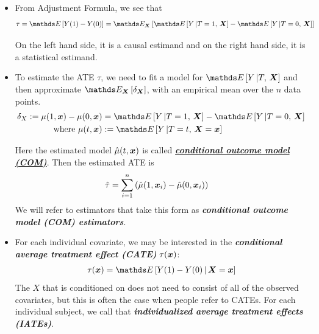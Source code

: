 \documentclass[11pt]{article}
\begin{document}
\begin{itemize}
\item From Adjustment Formula, we see that 
\begin{align*}
\tau= \E{}{Y(1) - Y(0)} &= \E{\mb{X}}{ \E{}{Y \,|T=1,\,\mb{X} }- \E{}{Y \,|T=0, \, \mb{X}}}  
\end{align*}

On the left hand side, it is a causal estimand and on the right hand side, it is a statistical estimand. 

\item To estimate the ATE $\tau$, we need to fit a model for $ \E{}{Y \,|T,\, \mb{X} }$ and then approximate $\E{\mb{X}}{\delta_{\mb{X}}}$, with an empirical mean over the $n$ data
points. 
\begin{align}
\delta_{X} := \mu(1, \mb{x}) - \mu(0, \mb{x}) &=  \E{}{Y \,|T=1,\,\mb{X} }- \E{}{Y \,|T=0, \, \mb{X}} \label{eqn: cond_outcome} \\
\text{where }\mu(t, \mb{x})&:= \E{}{Y \,|T=t,\,\mb{X} = \mb{x} } \nonumber
\end{align}

Here the estimated model $\hat{\mu}(t, \boldsymbol{x})$ is called \underline{\textbf{\emph{conditional outcome model (COM)}}}. Then the estimated ATE is
\begin{align}
\hat{\tau} &= \sum_{i=1}^{n}\left(\hat{\mu}(1, \boldsymbol{x}_i) - \hat{\mu}(0, \boldsymbol{x}_i)\right) \label{eqn: cond_outcome_est_ate}
\end{align} We will refer to estimators that take this form as \emph{\textbf{conditional outcome model (COM) estimators}}.

\item For each individual covariate, we may be interested in the \emph{\textbf{conditional average treatment effect (CATE)}} $\tau(\boldsymbol{x})$: 
\begin{align}
\tau(\mb{x})= \E{}{Y(1) - Y(0) \,|\, \mb{X} = \mb{x}} \label{eqn: cate}
\end{align} The $X$ that is conditioned on does not need to consist of all of the observed covariates, but this is often the case when people refer to CATEs. For each individual subject, we call that \emph{\textbf{individualized average treatment effects (IATEs)}}.


\end{itemize}
\end{document}

